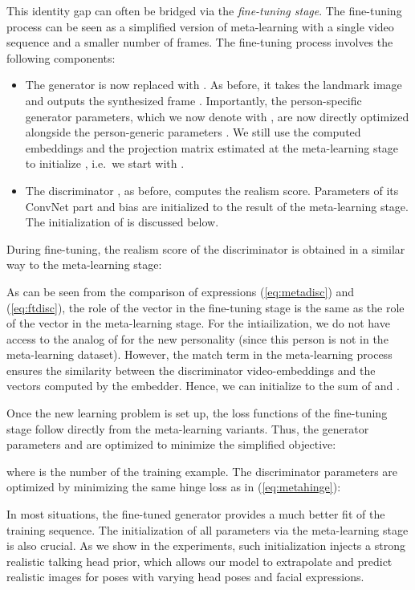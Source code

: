 \documentclass[10pt,twocolumn,letterpaper]{article}
\newcommand{\eq}[1]{(\ref{eq:#1})}
\begin{document}
This identity gap can often be bridged via the \textit{fine-tuning stage}. The fine-tuning process can be seen as a simplified version of meta-learning with a single video sequence and a smaller number of frames. The fine-tuning process involves the following components:
\begin{itemize}[noitemsep,nolistsep,leftmargin=*]
    \item The generator  is now replaced with . As before, it takes the landmark image  and outputs the synthesized frame . Importantly, the person-specific generator parameters, which we now denote with , are now directly optimized alongside the person-generic parameters . We still use the computed embeddings  and the projection matrix  estimated at the meta-learning stage to initialize , i.e.\ we start with .
     
     \item The discriminator , as before, computes the realism score. Parameters  of its ConvNet part  and bias  are initialized to the result of the meta-learning stage. The initialization of  is discussed below.
\end{itemize}
During fine-tuning, the realism score of the discriminator is obtained in a similar way to the meta-learning stage:

As can be seen from the comparison of expressions \eq{metadisc} and \eq{ftdisc}, the role of the vector  in the fine-tuning stage is the same as the role of the vector  in the meta-learning stage. For the intiailization, we do not have access to the analog of  for the new personality (since this person is not in the meta-learning dataset). However, the  match term  in the meta-learning process ensures the similarity between the discriminator video-embeddings and the vectors computed by the embedder. Hence, we can initialize  to the sum of  and .

Once the new learning problem is set up, the loss functions of the fine-tuning stage follow directly from the meta-learning variants. Thus, the generator parameters  and  are optimized to minimize the simplified objective:

where  is the number of the training example. The discriminator parameters  are optimized by minimizing the same hinge loss as in \eq{metahinge}:


In most situations, the fine-tuned generator provides a much better fit of the training sequence. The initialization of all parameters via the meta-learning stage is also crucial. As we show in the experiments, such initialization injects a strong realistic talking head prior, which allows our model to extrapolate and predict realistic images for poses with varying head poses and facial expressions.
\end{document}
